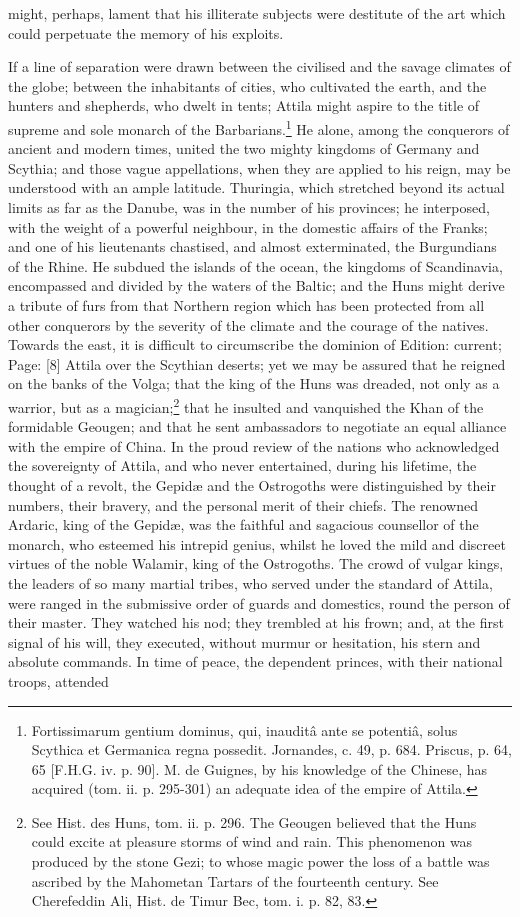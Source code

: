 might, perhaps, lament that his illiterate subjects were destitute of the art which could perpetuate the memory of his exploits.

If a line of separation were drawn between the civilised and the savage climates of the globe; between the inhabitants of cities, who cultivated the earth, and the hunters and shepherds, who dwelt in tents; Attila might aspire to the title of supreme and sole monarch of the Barbarians.\footnote{Fortissimarum gentium dominus, qui, inauditâ ante se potentiâ, solus Scythica et Germanica regna possedit. Jornandes, c. 49, p. 684. Priscus, p. 64, 65 [F.H.G. iv. p. 90]. M. de Guignes, by his knowledge of the Chinese, has acquired (tom. ii. p. 295-301) an adequate idea of the empire of Attila.} He alone, among the conquerors of ancient and modern times, united the two mighty kingdoms of Germany and Scythia; and those vague appellations, when they are applied to his reign, may be understood with an ample latitude. Thuringia, which stretched beyond its actual limits as far as the Danube, was in the number of his provinces; he interposed, with the weight of a powerful neighbour, in the domestic affairs of the Franks; and one of his lieutenants chastised, and almost exterminated, the Burgundians of the Rhine. He subdued the islands of the ocean, the kingdoms of Scandinavia, encompassed and divided by the waters of the Baltic; and the Huns might derive a tribute of furs from that Northern region which has been protected from all other conquerors by the severity of the climate and the courage of the natives. Towards the east, it is difficult to circumscribe the dominion of Edition: current; Page: [8] Attila over the Scythian deserts; yet we may be assured that he reigned on the banks of the Volga; that the king of the Huns was dreaded, not only as a warrior, but as a magician;\footnote{See Hist. des Huns, tom. ii. p. 296. The Geougen believed that the Huns could excite at pleasure storms of wind and rain. This phenomenon was produced by the stone Gezi; to whose magic power the loss of a battle was ascribed by the Mahometan Tartars of the fourteenth century. See Cherefeddin Ali, Hist. de Timur Bec, tom. i. p. 82, 83.} that he insulted and vanquished the Khan of the formidable Geougen; and that he sent ambassadors to negotiate an equal alliance with the empire of China. In the proud review of the nations who acknowledged the sovereignty of Attila, and who never entertained, during his lifetime, the thought of a revolt, the Gepidæ and the Ostrogoths were distinguished by their numbers, their bravery, and the personal merit of their chiefs. The renowned Ardaric, king of the Gepidæ, was the faithful and sagacious counsellor of the monarch, who esteemed his intrepid genius, whilst he loved the mild and discreet virtues of the noble Walamir, king of the Ostrogoths. The crowd of vulgar kings, the leaders of so many martial tribes, who served under the standard of Attila, were ranged in the submissive order of guards and domestics, round the person of their master. They watched his nod; they trembled at his frown; and, at the first signal of his will, they executed, without murmur or hesitation, his stern and absolute commands. In time of peace, the dependent princes, with their national troops, attended 